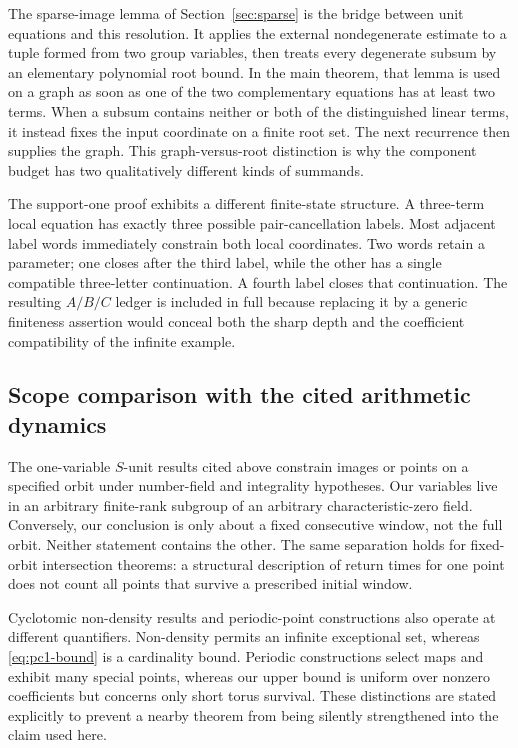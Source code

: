 \documentclass[11pt]{article}
\theoremstyle{definition}
\begin{document}
The sparse-image lemma of Section~\ref{sec:sparse} is the bridge between unit equations and this resolution. It applies the external nondegenerate estimate to a tuple formed from two group variables, then treats every degenerate subsum by an elementary polynomial root bound. In the main theorem, that lemma is used on a graph as soon as one of the two complementary equations has at least two terms. When a subsum contains neither or both of the distinguished linear terms, it instead fixes the input coordinate on a finite root set. The next recurrence then supplies the graph. This graph-versus-root distinction is why the component budget has two qualitatively different kinds of summands.

The support-one proof exhibits a different finite-state structure. A three-term local equation has exactly three possible pair-cancellation labels. Most adjacent label words immediately constrain both local coordinates. Two words retain a parameter; one closes after the third label, while the other has a single compatible three-letter continuation. A fourth label closes that continuation. The resulting \(A/B/C\) ledger is included in full because replacing it by a generic finiteness assertion would conceal both the sharp depth and the coefficient compatibility of the infinite example.

\subsection{Scope comparison with the cited arithmetic dynamics}

The one-variable \(S\)-unit results cited above constrain images or points on a specified orbit under number-field and integrality hypotheses. Our variables live in an arbitrary finite-rank subgroup of an arbitrary characteristic-zero field. Conversely, our conclusion is only about a fixed consecutive window, not the full orbit. Neither statement contains the other. The same separation holds for fixed-orbit intersection theorems: a structural description of return times for one point does not count all points that survive a prescribed initial window.

Cyclotomic non-density results and periodic-point constructions also operate at different quantifiers. Non-density permits an infinite exceptional set, whereas \eqref{eq:pc1-bound} is a cardinality bound. Periodic constructions select maps and exhibit many special points, whereas our upper bound is uniform over nonzero coefficients but concerns only short torus survival. These distinctions are stated explicitly to prevent a nearby theorem from being silently strengthened into the claim used here.
\end{document}
